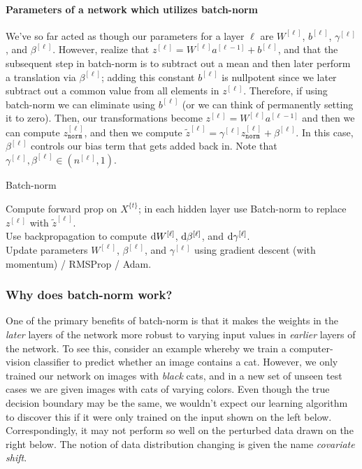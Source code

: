 \documentclass[12pt]{article}
\begin{document}
\paragraph{Parameters of a network which utilizes batch-norm} We've so far acted as though our parameters for a
layer $\ell$ are $W^{[\ell]}$, $b^{[\ell]}$, $\gamma^{[\ell]}$, and $\beta^{[\ell]}$. However, realize that 
$z^{[\ell]} = W^{[\ell]} a^{[\ell-1]} + b^{[\ell]}$, and that the subsequent step in batch-norm is to subtract out a mean and then later perform a translation via $\beta^{[\ell]}$; adding this constant $b^{[\ell]}$ is nullpotent since we later subtract out a common value from all elements in $z^{[\ell]}$. Therefore, if using batch-norm we can eliminate using $b^{[\ell]}$ (or we can think of permanently setting it to zero). Then, our transformations become 
$z^{[\ell]} = W^{[\ell]} a^{[\ell-1]}$ and then we can compute $z^{[\ell]}_{\texttt{norm}}$, and then we compute 
$\tilde z^{[\ell]} = \gamma^{[\ell]} z^{[\ell]}_{\texttt{norm}} + \beta^{[\ell]}$. In this case, $\beta^{[\ell]}$ controls our 
bias term that gets added back in. Note that $\gamma^{[\ell]}, \beta^{[\ell]} \in (n^{[\ell]}, 1)$.

\begin{algorithm}   \caption{Batch-norm}
   {
    Compute forward prop on $X^{\{t\}}$; in each hidden layer use Batch-norm to replace $z^{[\ell]}$ with $\tilde z^{[\ell]}$. \\
    Use backpropagation to compute $\operatorname{d}\!{W}^{[\ell]}$, $\operatorname{d}\!{\beta}^{[\ell]}$, and $\operatorname{d}\!{\gamma}^{[\ell]}$. \\
    Update parameters $W^{[\ell]}$, $\beta^{[\ell]}$, and $\gamma^{[\ell]}$ using {\small gradient descent (with momentum) / RMSProp / Adam}.
  } \end{algorithm}

\subsubsection{Why does batch-norm work?}
One of the primary benefits of batch-norm is that it makes the weights in the \emph{later} layers of the network
more robust to varying input values in \emph{earlier} layers of the network.
To see this, consider an example whereby we train a computer-vision classifier to predict whether an image contains
a cat. However, we only trained our network on images with \emph{black} cats, and in a new set of unseen test cases
we are given images with cats of varying colors. Even though the true decision boundary may be the same, we wouldn't expect our learning algorithm to discover this if it were only trained on the input shown on the left below. Correspondingly, it may not perform so well on the perturbed data drawn on the right below. The notion of data distribution changing is given the name \emph{covariate shift}.
\end{document}
